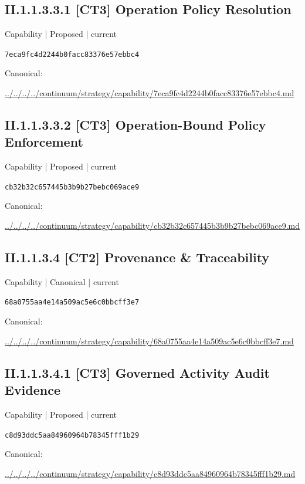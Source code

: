 \documentclass[10pt,a4paper]{article}
\begin{document}
\subsection*{II.1.1.3.3.1 [CT3] Operation Policy Resolution}
\label{element-7eca9fc4d2244b0facc83376e57ebbc4}
{\small Capability | Proposed | current}\par
\texttt{7eca9fc4d2244b0facc83376e57ebbc4}\par
Canonical: \par
{\footnotesize\url{../../../../continuum/strategy/capability/7eca9fc4d2244b0facc83376e57ebbc4.md}}\par
\subsection*{II.1.1.3.3.2 [CT3] Operation-Bound Policy Enforcement}
\label{element-cb32b32c657445b3b9b27bebc069ace9}
{\small Capability | Proposed | current}\par
\texttt{cb32b32c657445b3b9b27bebc069ace9}\par
Canonical: \par
{\footnotesize\url{../../../../continuum/strategy/capability/cb32b32c657445b3b9b27bebc069ace9.md}}\par
\subsection*{II.1.1.3.4 [CT2] Provenance \& Traceability}
\label{element-68a0755aa4e14a509ac5e6c0bbcff3e7}
{\small Capability | Canonical | current}\par
\texttt{68a0755aa4e14a509ac5e6c0bbcff3e7}\par
Canonical: \par
{\footnotesize\url{../../../../continuum/strategy/capability/68a0755aa4e14a509ac5e6c0bbcff3e7.md}}\par
\subsection*{II.1.1.3.4.1 [CT3] Governed Activity Audit Evidence}
\label{element-c8d93ddc5aa84960964b78345fff1b29}
{\small Capability | Proposed | current}\par
\texttt{c8d93ddc5aa84960964b78345fff1b29}\par
Canonical: \par
{\footnotesize\url{../../../../continuum/strategy/capability/c8d93ddc5aa84960964b78345fff1b29.md}}\par
\end{document}
